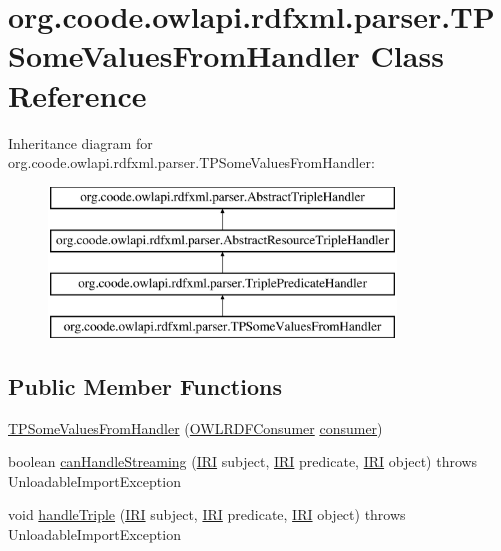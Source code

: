\hypertarget{classorg_1_1coode_1_1owlapi_1_1rdfxml_1_1parser_1_1_t_p_some_values_from_handler}{\section{org.\-coode.\-owlapi.\-rdfxml.\-parser.\-T\-P\-Some\-Values\-From\-Handler Class Reference}
\label{classorg_1_1coode_1_1owlapi_1_1rdfxml_1_1parser_1_1_t_p_some_values_from_handler}
}
Inheritance diagram for org.\-coode.\-owlapi.\-rdfxml.\-parser.\-T\-P\-Some\-Values\-From\-Handler\-:\begin{figure}[H]
\begin{center}
\leavevmode
\includegraphics[height=4.000000cm]{classorg_1_1coode_1_1owlapi_1_1rdfxml_1_1parser_1_1_t_p_some_values_from_handler}
\end{center}
\end{figure}
\subsection*{Public Member Functions}
\begin{DoxyCompactItemize}
\item 
\hyperlink{classorg_1_1coode_1_1owlapi_1_1rdfxml_1_1parser_1_1_t_p_some_values_from_handler_a9d0d03311dc1870849e1d1ce0be198d8}{T\-P\-Some\-Values\-From\-Handler} (\hyperlink{classorg_1_1coode_1_1owlapi_1_1rdfxml_1_1parser_1_1_o_w_l_r_d_f_consumer}{O\-W\-L\-R\-D\-F\-Consumer} \hyperlink{classorg_1_1coode_1_1owlapi_1_1rdfxml_1_1parser_1_1_abstract_triple_handler_a4ccf4d898ff01eb1cadfa04b23d54e9c}{consumer})
\item 
boolean \hyperlink{classorg_1_1coode_1_1owlapi_1_1rdfxml_1_1parser_1_1_t_p_some_values_from_handler_aac107f224e966a26b5e260000a50dc02}{can\-Handle\-Streaming} (\hyperlink{classorg_1_1semanticweb_1_1owlapi_1_1model_1_1_i_r_i}{I\-R\-I} subject, \hyperlink{classorg_1_1semanticweb_1_1owlapi_1_1model_1_1_i_r_i}{I\-R\-I} predicate, \hyperlink{classorg_1_1semanticweb_1_1owlapi_1_1model_1_1_i_r_i}{I\-R\-I} object)  throws Unloadable\-Import\-Exception 
\item 
void \hyperlink{classorg_1_1coode_1_1owlapi_1_1rdfxml_1_1parser_1_1_t_p_some_values_from_handler_ab2ff9559bcbd313f8de03b850302c953}{handle\-Triple} (\hyperlink{classorg_1_1semanticweb_1_1owlapi_1_1model_1_1_i_r_i}{I\-R\-I} subject, \hyperlink{classorg_1_1semanticweb_1_1owlapi_1_1model_1_1_i_r_i}{I\-R\-I} predicate, \hyperlink{classorg_1_1semanticweb_1_1owlapi_1_1model_1_1_i_r_i}{I\-R\-I} object)  throws Unloadable\-Import\-Exception 
\end{DoxyCompactItemize}

